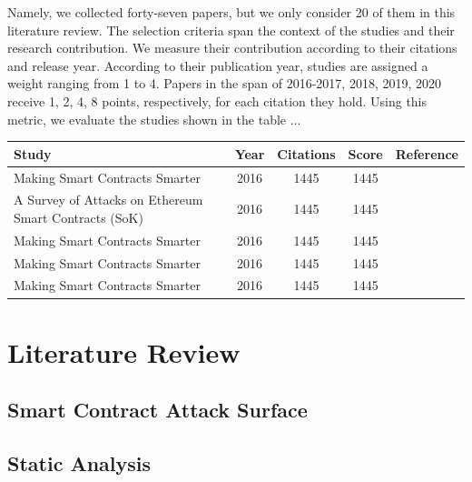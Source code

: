\documentclass[a4paper,11pt]{article}
\begin{document}
Namely, we collected forty-seven papers, but we only consider 20 of them in this
literature review. The selection criteria span the context of the studies and
their research contribution. We measure their contribution according to their
citations and release year. According to their publication year, studies are
assigned a weight ranging from 1 to 4. Papers in the span of 2016-2017,
2018, 2019, 2020  receive 1, 2, 4, 8 points, respectively, for each
citation they hold. Using this metric, we evaluate the studies shown in the
table ...\\

\begin{table}[htpb]
        \begin{center}
            \begin{tabular}{||l|c|c|c|c||}
                \hline
                Study & Year & Citations & Score & Reference \\ 
                \hline
                \hline
                Making Smart Contracts Smarter & 2016  & 1445 & 1445 & \cite{luu2016making} \\
                A Survey of Attacks on Ethereum Smart Contracts (SoK) & 2016  & 1445 & 1445 & \cite{luu2016making} \\
                Making Smart Contracts Smarter & 2016  & 1445 & 1445 & \cite{luu2016making} \\
                Making Smart Contracts Smarter & 2016  & 1445 & 1445 & \cite{luu2016making} \\
                Making Smart Contracts Smarter & 2016  & 1445 & 1445 & \cite{luu2016making} \\
            \end{tabular}
        \end{center}
    \end{table}

\section{Literature Review}

\subsection{Smart Contract Attack Surface}

\subsection{Static Analysis}
\end{document}
